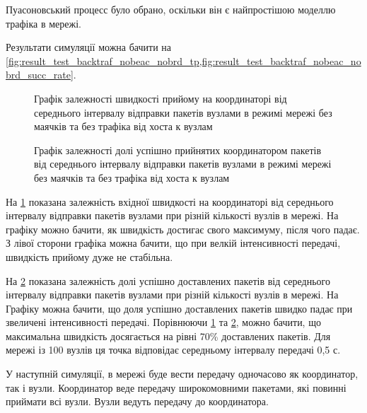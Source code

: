 \documentclass[a4paper,ukrainian,utf8,nocolumnsxix,floatsection,equationsection]{eskdtext}
\begin{document}
Пуасоновський процесс було обрано, оскільки він є найпростішою моделлю трафіка в мережі.

Результати симуляції можна бачити на \cref{fig:result_test_backtraf_nobeac_nobrd_tp,fig:result_test_backtraf_nobeac_nobrd_succ_rate}.

\begin{figure}[h]
	\centering
	\caption{\label{fig:result_test_backtraf_nobeac_nobrd_tp}Графік залежності швидкості прийому на координаторі від середнього інтервалу відправки пакетів вузлами в режимі мережі без маячків та без трафіка від хоста к вузлам}
\end{figure}

\begin{figure}[h]
	\centering
	\caption{\label{fig:result_test_backtraf_nobeac_nobrd_succ_rate}Графік залежності долі успішно прийнятих координатором пакетів від середнього інтервалу відправки пакетів вузлами в режимі мережі без маячків та без трафіка від хоста к вузлам}
\end{figure}

На \cref{fig:result_test_backtraf_nobeac_nobrd_tp} показана залежність вхідної швидкості на координаторі від середнього інтервалу відправки пакетів вузлами при різній кількості вузлів в мережі. На графіку можно бачити, як швидкість достигає свого максимуму, після чого падає. З лівої сторони графіка можна бачити, що при велкій інтенсивності передачі, швидкість прийому дуже не стабільна.

На \cref{fig:result_test_backtraf_nobeac_nobrd_succ_rate} показана залежність долі успішно доставлених пакетів від середнього інтервалу відправки пакетів вузлами при різній кількості вузлів в мережі. На Графіку можна бачити, що доля успішно доставлених пакетів швидко падає при звеличені інтенсивності передачі. Порівнюючи \cref{fig:result_test_backtraf_nobeac_nobrd_tp} та \cref{fig:result_test_backtraf_nobeac_nobrd_succ_rate}, можно бачити, що максимальна швидкість досягається на рівні 70\% доставлених пакетів. Для мережі із 100 вузлів ця точка відповідає середньому інтервалу передачі 0,5 с.

У наступній симуляції, в мережі буде вести передачу одночасово як координатор, так і вузли. Координатор веде передачу широкомовними пакетами, які повинні приймати всі вузли. Вузли ведуть передачу до координатора.
\end{document}
